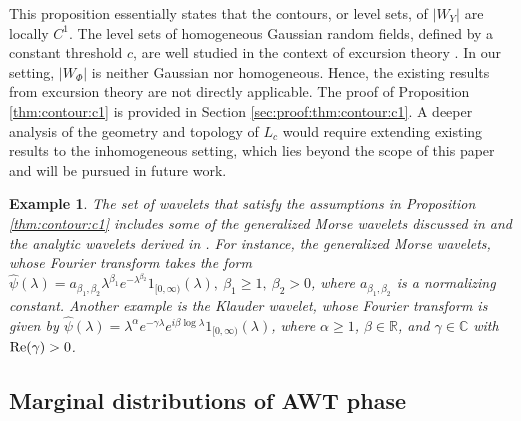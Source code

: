 \documentclass{amsart}
\newtheorem{Example}{Example}
\begin{document}
This proposition essentially states that the contours, or level sets, of $|W_Y|$ are locally $C^1$. The level sets of homogeneous Gaussian random fields, defined by a constant threshold $c$, are well studied in the context of excursion theory \cite{adler2007random}. In our setting, $|W_\Phi|$ is neither Gaussian
nor homogeneous. Hence, the existing results from excursion theory are not directly applicable.
The proof of Proposition \ref{thm:contour:c1} is provided in Section \ref{sec:proof:thm:contour:c1}.
A deeper analysis of the geometry and topology of $L_c$ would require extending
existing results to the inhomogeneous setting, which lies beyond the scope of this paper and will be pursued in future work.




\begin{Example}\label{example:wavelet}
The set of wavelets that satisfy the assumptions in Proposition \ref{thm:contour:c1}
includes some of the generalized Morse wavelets discussed in \cite[(14)]{lilly2010analytic}
and the analytic wavelets derived in \cite[(6)]{holighaus2019characterization}.
For instance, the generalized Morse wavelets, whose Fourier transform takes the form
$\widehat{\psi}(\lambda)= a_{\beta_{1},\beta_{2}}\lambda^{\beta_{1}}e^{-\lambda^{\beta_{2}}}1_{[0,\infty)}(\lambda),
\ \beta_{1}\geq1,\ \beta_{2}>0$,
where $a_{\beta_{1},\beta_{2}}$ is a normalizing constant.
Another example is the Klauder wavelet, whose Fourier transform is given by
$\widehat{\psi}(\lambda) = \lambda^{\alpha}e^{-\gamma \lambda}e^{i\beta \log \lambda} 1_{[0,\infty)}(\lambda)$,
where $\alpha\geq1$, $\beta\in \mathbb{R}$, and $\gamma\in \mathbb{C}$ with $\textup{Re}(\gamma)>0$.
\end{Example}










\subsection{Marginal distributions of AWT phase}\label{sec:phase}
\end{document}
